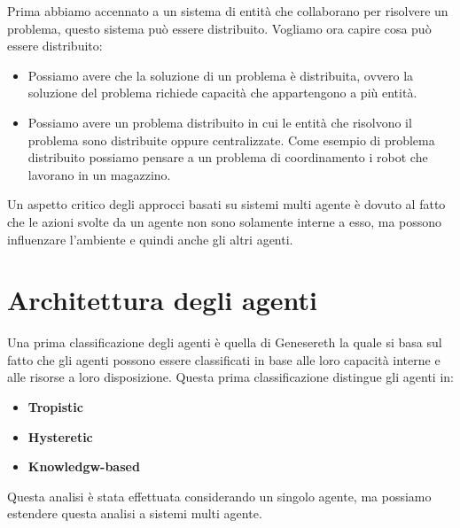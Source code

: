 Prima abbiamo accennato a un sistema di entità che collaborano per risolvere un
problema, questo sistema può essere distribuito. Vogliamo ora capire cosa
può essere distribuito:
\begin{itemize}
    \item Possiamo avere che la soluzione di un problema è distribuita, ovvero
          la soluzione del problema richiede capacità che appartengono a più
          entità.
    \item Possiamo avere un problema distribuito in cui le entità che risolvono
          il problema sono distribuite oppure centralizzate. Come esempio di
          problema distribuito possiamo pensare a un problema di coordinamento
          i robot che lavorano in un magazzino.
\end{itemize}

Un aspetto critico degli approcci basati su sistemi multi agente è dovuto al
fatto che le azioni svolte da un agente non sono solamente interne a esso, ma
possono influenzare l'ambiente e quindi anche gli altri agenti.
\section{Architettura degli agenti}
Una prima classificazione degli agenti è quella di Genesereth la quale si basa
sul fatto che gli agenti possono essere classificati in base alle loro capacità
interne e alle risorse a loro disposizione. Questa prima classificazione
distingue gli agenti in:
\begin{itemize}
    \item \textbf{Tropistic}
    \item \textbf{Hysteretic}
    \item \textbf{Knowledgw-based}
\end{itemize}
\begin{nota}
    Questa analisi è stata effettuata considerando un singolo agente, ma
    possiamo estendere questa analisi a sistemi multi agente.
\end{nota}
